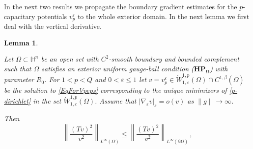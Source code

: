 \documentclass[10pt]{amsart}
\numberwithin{equation}{section}
\newtheorem{lemma}[theorem]{Lemma}
\theoremstyle{definition}
\newcommand{\He}{\mathbb{H}}
\begin{document}
\smallskip

  In the next two results we propagate the boundary gradient estimates for the $p$-capacitary potentials $v^\varepsilon_p$ to the whole exterior domain. In the next lemma we first deal with the vertical derivative.

\begin{lemma}
\label{vert-bd-int-bound}

Let $\Omega \subset \He^n$ be an open set with $C^2$-smooth boundary and bounded complement such that $\Omega$ satisfies an exterior uniform gauge-ball condition ($\mathbf{HP_\Omega}$) with parameter $R_0$. For $1<p <Q$ and $0<\varepsilon \leq 1$ let $v=v_p^\varepsilon \in  \dot{W}^{1,p}_{1,\varepsilon}(\Omega) \cap C^{1,\beta}(\overline{\Omega})$ be the solution to \eqref{EqForVpeps} corresponding to the unique minimizers of \eqref{p-dirichlet}  
in the set $\dot{W}^{1,p}_{1, \varepsilon} (\Omega)$. Assume that $|\nabla_\varepsilon  v |_\varepsilon=o(v)$ as $\| g\| \to \infty$.

Then
\begin{equation}
\label{Tv-bd-int-bound}
\left\| \frac{\left(T  v \right)^2}{v^2}   \right\|_{L^\infty ( \Omega)} %
\leq \left\| \frac{\left(T  v \right)^2 }{v^2}  \right\|_{L^\infty ( \partial\Omega)} \, ,
\end{equation}
\end{lemma}
\end{document}
